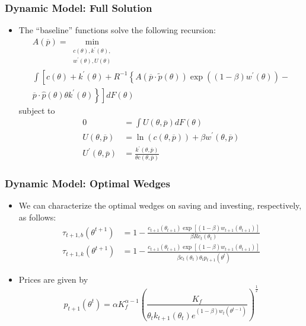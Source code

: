 \documentclass{beamer}
\begin{document}
\begin{frame}
    \frametitle{Dynamic Model: Full Solution}
    
    \begin{itemize}
        \item The ``baseline'' functions solve the following recursion: 
        \begin{multline*}
            A\left(\overline{p}\right)=\min_{\substack{c(\theta),k^{\prime}(\theta),\\
            w^{\prime}(\theta),U(\theta)
            }
            } \\ 
            \int\left[c\left(\theta\right)+k^{\prime}\left(\theta\right)+R^{-1}\left\{ A\left(\overline{p}\cdot\tilde{p}\left(\theta\right)\right)\exp\left(\left(1-\beta\right)w^{\prime}(\theta)\right)- \right.\right.\\
            \left.\left.\overline{p}\cdot\hat{p}\left(\theta\right)\theta k^{\prime}\left(\theta\right)\right\} \right]dF\left(\theta\right)
        \end{multline*}
        subject to 
        \begin{align*}
            0&=\int U(\theta,\overline{p})dF(\theta)\\U(\theta,\overline{p})&=\ln\left(c(\theta,\overline{p})\right)+\beta w^{\prime}(\theta,\overline{p})\\U^{\prime}(\theta,\overline{p})&=\frac{k^{\prime}(\theta,\overline{p})}{\theta c(\theta,\overline{p})}
        \end{align*}
    \end{itemize}
    
\end{frame}

\begin{frame}
    \frametitle{Dynamic Model: Optimal Wedges}

    \begin{itemize}
        \item We can characterize the optimal wedges on saving and investing, respectively, as follows: 
        \begin{align*}
            \tau_{t+1,b}\left(\theta^{t+1}\right)&=1-\frac{c_{t+1}\left(\theta_{t+1}\right)\exp\left[\left(1-\beta\right)w_{t+1}\left(\theta_{t+1}\right)\right]}{\beta Rc_{t}\left(\theta_{t}\right)}\\
            \tau_{t+1,k}\left(\theta^{t+1}\right)&=1-\frac{c_{t+1}\left(\theta_{t+1}\right)\exp\left[\left(1-\beta\right)w_{t+1}\left(\theta_{t+1}\right)\right]}{\beta c_{t}\left(\theta_{t}\right)\theta_{t}p_{t+1}\left(\theta^{t}\right)}
        \end{align*} 
        \item Prices are given by 
        \begin{equation*}
            p_{t+1}\left(\theta^{t}\right) =\alpha K_{f}^{\alpha-1}\left(\frac{K_{f}}{\theta_{t}k_{t+1}\left(\theta_{t}\right)e^{\left(1-\beta\right)w_{t}\left(\theta^{t-1}\right)}}\right)^{\frac{1}{\varepsilon}}
        \end{equation*}
    \end{itemize}

\end{frame}
\end{document}
